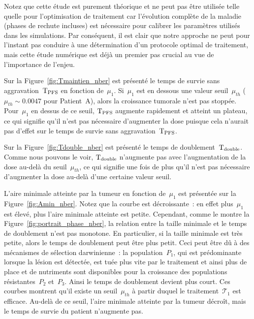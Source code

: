 \documentclass[11pt]{amsart}
\numberwithin{equation}{section}
\newcommand{\treat}{\mathcal{T}}
\newcommand{\TPFS}{{\rm T_{PFS}}}
\newcommand{\Td}{{\rm T_{double}}}
\newcommand{\muI}{\mu_1}
\newcommand{\Nber}{Patient~A\xspace}
\begin{document}
Notez que cette étude est purement théorique et ne peut pas être utilisée telle quelle pour l'optimisation de traitement car l'évolution complète de la maladie (phases de rechute incluses) est nécessaire pour calibrer les paramètres utilisés dans les simulations. Par conséquent, il est clair que notre approche ne peut pour l'instant pas conduire à une détermination d'un protocole optimal de traitement, mais cette étude numérique est déjà un premier pas crucial au vue de l'importance de l'enjeu.


Sur la Figure~\ref{fig:Tmaintien_nber} est présenté le temps de survie sans aggravation~$\TPFS$ en fonction de~$\muI$. 
Si~$\muI$ est en dessous une valeur seuil~$\mu_{th}$ ($\mu_{th}\sim 0.0047$ pour \Nber), alors la croissance tumorale n'est pas stoppée.  
Pour~$\muI$ en dessus de ce seuil, $\TPFS$ augmente rapidement et atteint un plateau, ce qui signifie qu'il n'est pas nécessaire d'augmenter la dose puisque cela n'aurait pas d'effet sur  le temps de survie sans aggravation~$\TPFS$.

Sur la Figure~\ref{fig:Tdouble_nber} est présenté le temps de doublement~$\Td$. 
Comme nous pouvons le voir, $\Td$ n'augmente pas avec l'augmentation de la dose au-delà du seuil~$\mu_{th}$, ce qui signifie une fois de plus qu'il n'est pas nécessaire d'augmenter la dose au-delà d'une certaine valeur seuil.


L'aire minimale atteinte par la tumeur en fonction de~$\muI$ est présentée sur la Figure~\ref{fig:Amin_nber}. Notez que la courbe est décroissante~: en effet plus~$\muI$ est élevé, plus l'aire minimale atteinte est petite. Cependant, comme le montre la  Figure~\ref{fig:portrait_phase_nber}, la relation entre la taille minimale et le temps de doublement n'est pas monotone. En particulier, si la taille minimale est très petite, alors le temps de doublement peut être plus petit.  
Ceci peut être dû à des mécanismes de sélection darwinienne~: 
la population~$P_1$, qui est prédominante lorsque la lésion est détectée, est tuée plus vite par le traitement et ainsi plus de place et de nutriments sont disponibles pour la croissance des populations résistantes~$P_2$ et~$P_3$. Ainsi le temps de doublement devient plus court. 
Ces courbes montrent qu'il existe un seuil~$\mu_{th}$ à partir duquel le traitement~$\treat_1$ est efficace. Au-delà de ce seuil, l'aire minimale atteinte par la tumeur décroît, mais le temps de survie du patient n'augmente pas.
\end{document}
